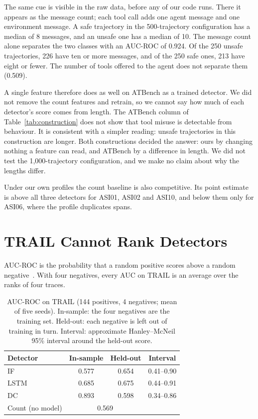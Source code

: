 \documentclass[conference]{IEEEtran}
\begin{document}
The same cue is visible in the raw data, before any of our code runs. There it appears as the message count; each tool call adds one agent message and one environment message. A safe trajectory in the 500-trajectory configuration has a median of 8 messages, and an unsafe one has a median of 10. The message count alone separates the two classes with an AUC-ROC of 0.924. Of the 250 unsafe trajectories, 226 have ten or more messages, and of the 250 safe ones, 213 have eight or fewer. The number of tools offered to the agent does not separate them (0.509).

A single feature therefore does as well on ATBench as a trained detector. We did not remove the count features and retrain, so we cannot say how much of each detector's score comes from length. The ATBench column of Table~\ref{tab:construction} does not show that tool misuse is detectable from behaviour. It is consistent with a simpler reading: unsafe trajectories in this construction are longer. Both constructions decided the answer: ours by changing nothing a feature can read, and ATBench by a difference in length. We did not test the 1,000-trajectory configuration, and we make no claim about why the lengths differ.

Under our own profiles the count baseline is also competitive. Its point estimate is above all three detectors for ASI01, ASI02 and ASI10, and below them only for ASI06, where the profile duplicates spans.

\section{TRAIL Cannot Rank Detectors}
\label{sec:trail}

AUC-ROC is the probability that a random positive scores above a random negative~\cite{hanley1982meaning}. With four negatives, every AUC on TRAIL is an average over the ranks of four traces.

\begin{table}[t]
\caption{AUC-ROC on TRAIL (144 positives, 4 negatives; mean of five seeds). In-sample: the four negatives are the training set. Held-out: each negative is left out of training in turn. Interval: approximate Hanley--McNeil 95\% interval around the held-out score.}
\label{tab:trail}
\centering
\footnotesize
\begin{tabular}{@{}lccc@{}}
\toprule
Detector & In-sample & Held-out & Interval \\
\midrule
IF & 0.577 & 0.654 & 0.41--0.90 \\
LSTM & 0.685 & 0.675 & 0.44--0.91 \\
DC & 0.893 & 0.598 & 0.34--0.86 \\
Count (no model) & \multicolumn{2}{c}{0.569} & \\
\bottomrule
\end{tabular}
\end{table}
\end{document}
